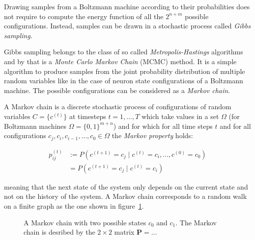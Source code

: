 Drawing samples from a Boltzmann machine according to their probabilities does not require to 
compute the energy function of all the $2^{n+m}$ possible configurations. Instead, samples can be drawn 
in a stochastic process called \textit{Gibbs sampling}.

Gibbs sampling belongs to the class of so called \textit{Metropolis-Hastings} algorithms and by that is 
a \textit{Monte Carlo Markov Chain} (MCMC) method. It is a simple algorithm to produce samples from the 
joint probability distribution of multiple random variables like in the case of neuron state configurations
of a Boltzmann machine. The possible configurations can be considered as a \textit{Markov chain}.

A Markov chain is a discrete stochastic process of configurations of random variables $C=\{c^{(t)}\}$
at timesteps $t=1, \dots, T$ which take values in a set $\Omega$ (for Boltzmann machines 
$\Omega=\{0,1\}^{m+n}$) and for which for all time steps $t$ and for all configurations 
$c_j, c_i, c_{i-1}, \dots, c_0 \in \Omega$ the \textit{Markov property} holds:

\begin{align}
    p_{ij}^{(t)} &:= P(c^{(t+1)} = c_j \mid c^{(t)} = c_i, \dots, c^{(0)} = c_0) \\
                 & = P(c^{(t+1)} = c_j \mid c^{(t)} = c_i) 
\end{align}

meaning that the next state of the system only depends on the current state and not on the 
history of the system. A Markov chain corresponds to a random walk on a finite graph 
as the one shown in figure~\ref{fig:markov}.

\begin{figure}
    \label{fig:markov}
    \centering
    \caption{A Markov chain with two possible states $c_0$ and $c_1$. The Markov chain is 
desribed by the $2 \times 2$ matrix $\bm{P}=\dots$}
\end{figure}

